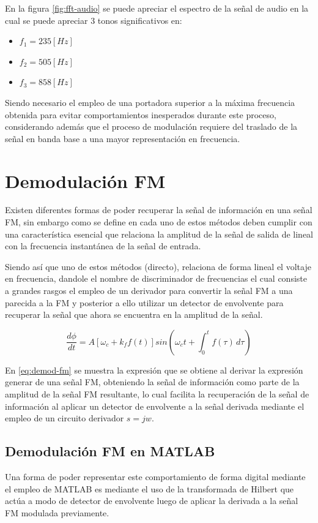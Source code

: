 \documentclass[conference]{IEEEtran}
\begin{document}
	
	En la figura \ref{fig:fft-audio} se puede apreciar el espectro de la señal de audio en la cual se puede apreciar 3 tonos significativos en:
	\begin{itemize}
		\item $f_1 = 235 [Hz] $
		\item $f_2 = 505 [Hz]$
		\item $f_3 = 858 [Hz]$
	\end{itemize}
	
	Siendo necesario el empleo de una portadora superior a la máxima frecuencia obtenida para evitar comportamientos inesperados durante este proceso, considerando además que el proceso de modulación requiere del traslado de la señal en banda base a una mayor representación en frecuencia.
	
	\section{ Demodulación FM }
	
	Existen diferentes formas de poder recuperar la señal de información en una señal FM, sin embargo como se define en \cite{stremler2006} cada uno de estos métodos deben cumplir con una característica esencial que relaciona la amplitud de la señal de salida de lineal con la frecuencia instantánea de la señal de entrada.
	
	Siendo así que uno de estos métodos (directo), relaciona de forma lineal el voltaje en frecuencia, dandole el nombre de discriminador de frecuencias el cual consiste a grandes rasgos el empleo de un derivador para convertir la señal FM a una parecida a la FM y posterior a ello utilizar un detector de envolvente para recuperar la señal que ahora se encuentra en la amplitud de la señal.	
	
	\begin{equation}
		\frac{d \phi}{dt} = A \left[ \omega_c + k_f f(t) \right] sin \left( \omega_c t + \int_{0}^{t} f(\tau) \, d\tau \right)
		\label{eq:demod-fm}
	\end{equation}
	
	En \ref{eq:demod-fm} se muestra la expresión que se obtiene al derivar la expresión generar de una señal FM, obteniendo la señal de información como parte de la amplitud de la señal FM resultante, lo cual facilita la recuperación de la señal de información al aplicar un detector de envolvente a la señal derivada mediante el empleo de un circuito derivador $ s = jw $.
	
	\subsection{Demodulación FM en MATLAB}
	Una forma de poder representar este comportamiento de forma digital mediante el empleo de MATLAB es mediante el uso de la transformada de Hilbert que actúa a modo de detector de envolvente luego de aplicar la derivada a la señal FM modulada previamente.
	
\end{document}
